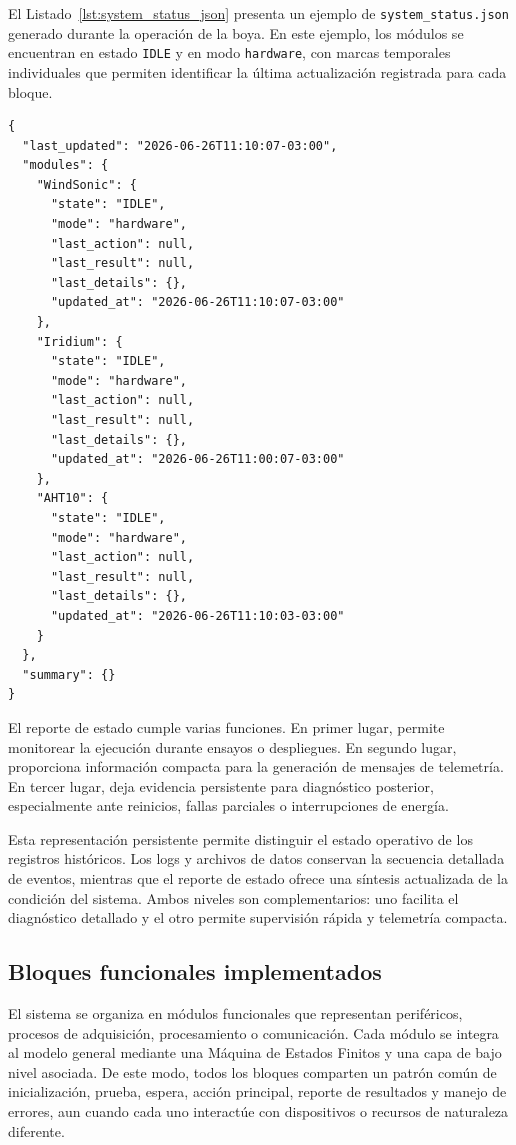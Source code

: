El Listado~\ref{lst:system_status_json} presenta un ejemplo de \texttt{system\_status.json} generado durante la operación de la boya. En este ejemplo, los módulos se encuentran en estado \texttt{IDLE} y en modo \texttt{hardware}, con marcas temporales individuales que permiten identificar la última actualización registrada para cada bloque.

\begin{lstlisting}[style=pseudocodigo, caption={Fragmento representativo del reporte \texttt{system\_status.json}.}, label={lst:system_status_json}]
{
  "last_updated": "2026-06-26T11:10:07-03:00",
  "modules": {
    "WindSonic": {
      "state": "IDLE",
      "mode": "hardware",
      "last_action": null,
      "last_result": null,
      "last_details": {},
      "updated_at": "2026-06-26T11:10:07-03:00"
    },
    "Iridium": {
      "state": "IDLE",
      "mode": "hardware",
      "last_action": null,
      "last_result": null,
      "last_details": {},
      "updated_at": "2026-06-26T11:00:07-03:00"
    },
    "AHT10": {
      "state": "IDLE",
      "mode": "hardware",
      "last_action": null,
      "last_result": null,
      "last_details": {},
      "updated_at": "2026-06-26T11:10:03-03:00"
    }
  },
  "summary": {}
}
\end{lstlisting}

El reporte de estado cumple varias funciones. En primer lugar, permite monitorear la ejecución durante ensayos o despliegues. En segundo lugar, proporciona información compacta para la generación de mensajes de telemetría. En tercer lugar, deja evidencia persistente para diagnóstico posterior, especialmente ante reinicios, fallas parciales o interrupciones de energía.

Esta representación persistente permite distinguir el estado operativo de los registros históricos. Los logs y archivos de datos conservan la secuencia detallada de eventos, mientras que el reporte de estado ofrece una síntesis actualizada de la condición del sistema. Ambos niveles son complementarios: uno facilita el diagnóstico detallado y el otro permite supervisión rápida y telemetría compacta.

\subsection{Bloques funcionales implementados}
\label{subsec:bloques_funcionales_software}

El sistema se organiza en módulos funcionales que representan periféricos, procesos de adquisición, procesamiento o comunicación. Cada módulo se integra al modelo general mediante una Máquina de Estados Finitos y una capa de bajo nivel asociada. De este modo, todos los bloques comparten un patrón común de inicialización, prueba, espera, acción principal, reporte de resultados y manejo de errores, aun cuando cada uno interactúe con dispositivos o recursos de naturaleza diferente.
	
